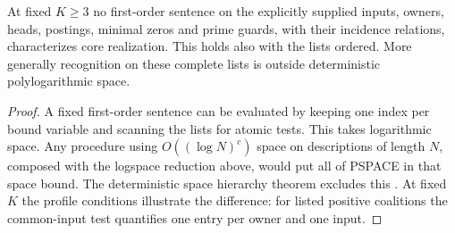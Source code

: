 \begin{corollary}
\label{core:cor:guard-incidence-lower-bound}
At fixed $K\ge3$ no first-order sentence on the explicitly supplied
inputs, owners, heads, postings, minimal zeros and prime guards,
with their incidence relations, characterizes core realization.
This holds also with the lists ordered. More generally recognition
on these complete lists is outside deterministic polylogarithmic
space.
\end{corollary}
\begin{proof}
A fixed first-order sentence can be evaluated by keeping one index
per bound variable and scanning the lists for atomic tests.
This takes logarithmic space. Any procedure using
$O((\log N)^c)$ space on descriptions of length $N$, composed with
the logspace reduction above, would put all of PSPACE in that
space bound. The deterministic space hierarchy theorem excludes
this \cite{StearnsHartmanisLewis1965}. At fixed $K$ the profile
conditions illustrate the difference: for listed positive coalitions
the common-input test quantifies one entry per owner and one input.
\end{proof}


